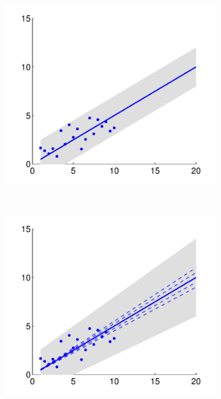 \begin{figure}
\centering
	\begin{subfigure}[b]{0.45\textwidth}
		\centering	
		\includegraphics[width=\textwidth]{./lecture5/LinReg.pdf}
	\end{subfigure}
	~
	\begin{subfigure}[b]{0.45\textwidth}
		\centering
		\includegraphics[width=\textwidth]{./lecture5/LinRegBayes.pdf}
	\end{subfigure}
\end{figure}


